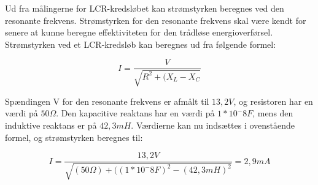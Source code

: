 Ud fra målingerne for LCR-kredsløbet kan strømstyrken beregnes ved den resonante frekvens. Strømstyrken for den resonante frekvens skal være kendt for senere at kunne beregne effektiviteten for den trådløse energioverførsel. Strømstyrken ved et LCR-kredsløb kan beregnes ud fra følgende formel:

\begin{equation}
I = \frac{V}{\sqrt{R^2 + (X_L - X_C}}
\end{equation}

Spændingen V for den resonante frekvens er afmålt til $13,2 V$, og resistoren har en værdi på $50 \Omega$. Den kapacitive reaktans har en værdi på $1 * 10^-8 F$, mens den induktive reaktans er på $42,3 mH$. Værdierne kan nu indsættes i ovenstående formel, og strømstyrken beregnes til:

\begin{equation}
I = \frac{13,2 V}{\sqrt{(50 \Omega) + ((1 * 10^-8 F)^2 - (42,3 mH)^2}} = 2,9 mA
\end{equation}
